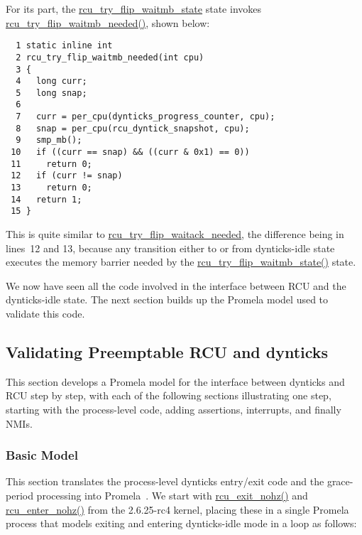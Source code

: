 For its part, the \url{rcu_try_flip_waitmb_state} state
invokes \url{rcu_try_flip_waitmb_needed()}, shown below:

{ \scriptsize
\begin{verbatim}
  1 static inline int
  2 rcu_try_flip_waitmb_needed(int cpu)
  3 {
  4   long curr;
  5   long snap;
  6 
  7   curr = per_cpu(dynticks_progress_counter, cpu);
  8   snap = per_cpu(rcu_dyntick_snapshot, cpu);
  9   smp_mb();
 10   if ((curr == snap) && ((curr & 0x1) == 0))
 11     return 0;
 12   if (curr != snap)
 13     return 0;
 14   return 1;
 15 }
\end{verbatim}
}

This is quite similar to \url{rcu_try_flip_waitack_needed},
the difference being in lines~12 and 13, because any transition
either to or from dynticks-idle state executes the memory barrier
needed by the \url{rcu_try_flip_waitmb_state()} state.

We now have seen all the code involved in the interface between
RCU and the dynticks-idle state.
The next section builds up the Promela model used to validate this
code.

 \QuickQuizEnd

\subsection{Validating Preemptable RCU and dynticks}
\label{app:formal:Validating Preemptable RCU and dynticks}

This section develops a Promela model for the interface between
dynticks and RCU step by step, with each of the following sections
illustrating one step, starting with the process-level code,
adding assertions, interrupts, and finally NMIs.

\subsubsection{Basic Model}
\label{app:formal:Basic Model}

This section translates the process-level dynticks entry/exit
code and the grace-period processing into
Promela~\cite{Holzmann03a}.
We start with \url{rcu_exit_nohz()} and
\url{rcu_enter_nohz()}
from the 2.6.25-rc4 kernel, placing these in a single Promela
process that models exiting and entering dynticks-idle mode in
a loop as follows:

